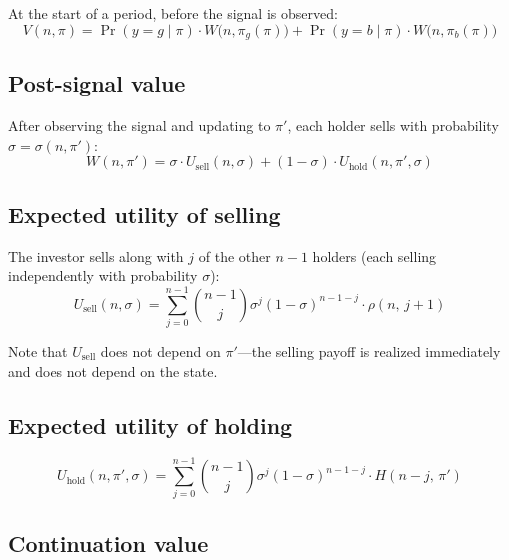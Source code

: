 \documentclass[11pt]{article}
\begin{document}
At the start of a period, before the signal is observed:
\begin{equation}
    V(n, \pi)
    = \Pr(y{=}g \mid \pi) \cdot W\!\bigl(n, \pi_g(\pi)\bigr)
    + \Pr(y{=}b \mid \pi) \cdot W\!\bigl(n, \pi_b(\pi)\bigr)
    \label{eq:bellman_pre}
\end{equation}

\subsection{Post-signal value}

After observing the signal and updating to $\pi'$, each holder sells with
probability $\sigma = \sigma(n, \pi')$:
\begin{equation}
    W(n, \pi')
    = \sigma \cdot U_{\text{sell}}(n, \sigma)
    + (1-\sigma) \cdot U_{\text{hold}}(n, \pi', \sigma)
    \label{eq:bellman_post}
\end{equation}

\subsection{Expected utility of selling}

The investor sells along with $j$ of the other $n-1$ holders (each selling
independently with probability $\sigma$):
\begin{equation}
    U_{\text{sell}}(n, \sigma)
    = \sum_{j=0}^{n-1} \binom{n-1}{j} \sigma^j (1-\sigma)^{n-1-j}
      \cdot \rho(n,\, j+1)
    \label{eq:u_sell}
\end{equation}

Note that $U_{\text{sell}}$ does not depend on $\pi'$---the selling payoff is
realized immediately and does not depend on the state.

\subsection{Expected utility of holding}

\begin{equation}
    U_{\text{hold}}(n, \pi', \sigma)
    = \sum_{j=0}^{n-1} \binom{n-1}{j} \sigma^j (1-\sigma)^{n-1-j}
      \cdot H(n{-}j,\, \pi')
    \label{eq:u_hold}
\end{equation}

\subsection{Continuation value}
\end{document}
